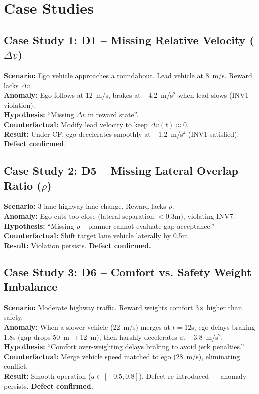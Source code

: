 \documentclass[conference]{IEEEtran}
\theoremstyle{plain}
\begin{document}
\section{Case Studies}
\label{sec:cases}

\subsection{Case Study 1: D1 -- Missing Relative Velocity ($\Delta v$)}
\textbf{Scenario:} Ego vehicle approaches a roundabout. Lead vehicle at 8~m/s. Reward lacks $\Delta v$.
\\
\textbf{Anomaly:} Ego follows at 12~m/s, brakes at $-4.2$~m/s$^2$ when lead slows (INV1 violation).
\\
\textbf{Hypothesis:} ``Missing $\Delta v$ in reward state''.
\\
\textbf{Counterfactual:} Modify lead velocity to keep $\Delta v(t)\approx0$.
\\
\textbf{Result:} Under CF, ego decelerates smoothly at $-1.2$~m/s$^2$ (INV1 satisfied). \textbf{Defect confirmed}.

\subsection{Case Study 2: D5 -- Missing Lateral Overlap Ratio ($\rho$)}
\textbf{Scenario:} 3-lane highway lane change. Reward lacks $\rho$.
\\
\textbf{Anomaly:} Ego cuts too close (lateral separation $<0.3$m), violating INV7.
\\
\textbf{Hypothesis:} ``Missing $\rho$ -- planner cannot evaluate gap acceptance.''
\\
\textbf{Counterfactual:} Shift target lane vehicle laterally by 0.5m.
\\
\textbf{Result:} Violation persists. \textbf{Defect confirmed.}

\subsection{Case Study 3: D6 -- Comfort vs. Safety Weight Imbalance}
\textbf{Scenario:} Moderate highway traffic. Reward weights comfort 3$\times$ higher than safety.
\\
\textbf{Anomaly:} When a slower vehicle (22~m/s) merges at $t=12$s, ego delays braking 1.8s (gap drops 50~m$\to$12~m), then harshly decelerates at $-3.8$~m/s$^2$.
\\
\textbf{Hypothesis:} ``Comfort over-weighting delays braking to avoid jerk penalties.''
\\
\textbf{Counterfactual:} Merge vehicle speed matched to ego (28~m/s), eliminating conflict.
\\
\textbf{Result:} Smooth operation ($a\in[-0.5,0.8]$). Defect re-introduced --- anomaly persists. \textbf{Defect confirmed.}
\end{document}
